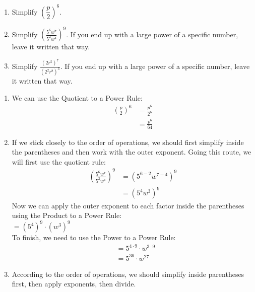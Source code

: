 \documentclass{ximera}
\begin{document}
\begin{example}
\begin{enumerate}
\item Simplify $\left(\dfrac{p}{2}\right)^6$.
        \item  Simplify $\left(\frac{5^6w^7}{5^2w^4}\right)^9$.
                  If you end up with a large power of a specific number,
                  leave it written that way.
\item     Simplify $\frac{\left(2r^5\right)^7}{\left(2^2 r^8\right)^3}$.
                  If you end up with a large power of a specific number,
                  leave it written that way.
\end{enumerate}
\begin{explanation}
\begin{enumerate}
\item    We can use the Quotient to a Power Rule:
\begin{align*}
                    \left(\frac{p}{2}\right)^6 &=\frac{p^6}{2^6}\\
                    &=\frac{p^6}{64}
\end{align*}
        \item If we stick closely to the order of operations,
                  we should first simplify inside the parentheses and then work with the outer exponent.
                  Going this route,
                  we will first use the quotient rule:
\begin{align*}
                   \left(\frac{5^6w^7}{5^2w^4}\right)^9 &= \left(5^{6-2}w^{7-4}\right)^9\\
                    &=  \left(5^{4}w^{3}\right)^9
                    \end{align*}
                    Now we can apply the outer exponent to each factor inside the parentheses using the Product to a Power Rule: \\
                     $= \left(5^{4}\right)^9\cdot \left(w^{3}\right)^9$ \\
                    To finish, we need to use the Power to a Power Rule:
                   \begin{align*}
                    &= 5^{4\cdot 9}\cdot w^{3 \cdot 9}\\
                    &= 5^{36}\cdot w^{27}
\end{align*}
       \item According to the order of operations,
                  we should simplify inside parentheses first,
                  then apply exponents, then divide.

\end{enumerate}
\end{explanation}
\end{example}
\end{document}
